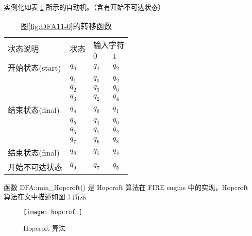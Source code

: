 实例化如表 \ref{tab:DFA411-1} 所示的自动机。（含有开始不可达状态）

\begin{table}[!htbp]
    \caption{图\ref{fig:DFA11-0}的转移函数}
    \label{tab:DFA411-1}
    \centering
    \small%
    \setlength{\tabcolsep}{4pt}%
    \renewcommand{\arraystretch}{1.2}%
        \begin{tabular}{l p{4em}<{\centering} p{3em}<{\centering} p{3em}<{\centering}}
        \toprule %
        \multirow{2}{*}{状态说明} & \multirow{2}{*}{状态} & \multicolumn{2}{c}{输入字符} \\
		\cline{3-4}      &    &$0$ & $1$  \\
        \midrule%
        开始状态(start)  & $q_0$ & $q_1$   & $q_2$   \\
                        & $q_1$ & $q_5$   & $q_2$   \\
                        & $q_2$ & $q_3$   & $q_6$   \\
                        & $q_3$ & $q_2$   & $q_4$   \\
        结束状态(final) & $q_4$ & $q_8$   & $q_1$   \\
                        & $q_5$ & $q_1$   & $q_6$   \\
                        & $q_6$ & $q_7$   & $q_2$   \\
                        & $q_7$ & $q_6$   & $q_8$   \\
        结束状态(final) & $q_8$ & $q_5$   & $q_4$   \\
        开始不可达状态    & $q_9$ & $q_7$   & $q_5$   \\
        \bottomrule%
    \end{tabular}
\end{table}

函数 DFA::min\_Hopcroft() 是 Hopcroft 算法在 FIRE engine 中的实现，Hopcroft 算法在文中\cite{watson1993taxonomyb}描述如图 \ref{fig:desHopcroft} 所示
\begin{figure}[!htbp]
    \centering
        \texttt{[image: hopcroft]}
    \caption{ Hopcroft 算法}
    \label{fig:desHopcroft}
\end{figure}

